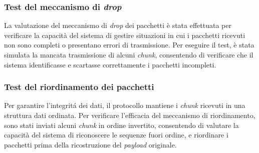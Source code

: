\documentclass[12pt,a4paper,twoside]{book}
\begin{document}
\subsubsection{Test del meccanismo di \emph{drop}}
\begin{table}[H]
    \centering
    \caption{Condizioni del test del meccanismo di \emph{drop}.}
    \label{tab:T3-conditions}
\end{table}
La valutazione del meccanismo di \emph{drop} dei pacchetti è stata effettuata
per verificare la capacità del sistema di gestire situazioni in cui i pacchetti
ricevuti non sono completi o presentano errori di trasmissione.
Per eseguire il test, è stata simulata la mancata trasmissione di alcuni \emph{chunk}, consentendo di
verificare che il sistema identificasse e scartasse correttamente i pacchetti incompleti.

\subsubsection{Test del riordinamento dei pacchetti}
\begin{table}[H]
    \centering
    \caption{Condizioni del test del meccanismo di riordinamento.}
    \label{tab:T4-conditions}
\end{table}
Per garantire l'integrit\'a dei dati, il protocollo mantiene i \emph{chunk} ricevuti
in una struttura dati ordinata.
Per verificare l'efficacia del meccanismo di riordinamento, sono stati inviati
alcuni \emph{chunk} in ordine invertito, consentendo di valutare la capacità del sistema
di riconoscere le sequenze fuori ordine, e riordinare i pacchetti prima della ricostruzione
del \emph{payload} originale.
\end{document}
